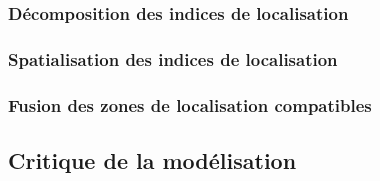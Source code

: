 \subsubsection{Décomposition des indices de localisation}
\label{subsec:9-3-2-1}

\subsubsection{Spatialisation des indices de localisation}
\label{subsec:9-3-2-2}

\subsubsection{Fusion des zones de localisation compatibles}
\label{subsec:9-3-2-3}

\subsection{Critique de la modélisation}
\label{subsec:9-3-3}


